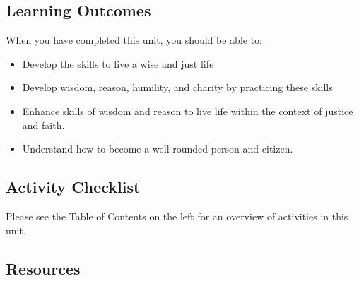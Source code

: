 \documentclass[
]{book}
\providecommand{\tightlist}{%
  \setlength{\itemsep}{0pt}\setlength{\parskip}{0pt}}
\begin{document}
\hypertarget{learning-outcomes}{%
\subsection*{Learning Outcomes}\label{learning-outcomes}}

When you have completed this unit, you should be able to:

\begin{itemize}
\tightlist
\item
  Develop the skills to live a wise and just life\\
\item
  Develop wisdom, reason, humility, and charity by practicing these skills\\
\item
  Enhance skills of wisdom and reason to live life within the context of justice and faith.\\
\item
  Understand how to become a well-rounded person and citizen.
\end{itemize}

\hypertarget{activity-checklist}{%
\subsection*{Activity Checklist}\label{activity-checklist}}

\begin{reflect}
Please see the Table of Contents on the left for an overview of activities in this unit.
\end{reflect}

\hypertarget{resources}{%
\subsection*{Resources}\label{resources}}
\end{document}
